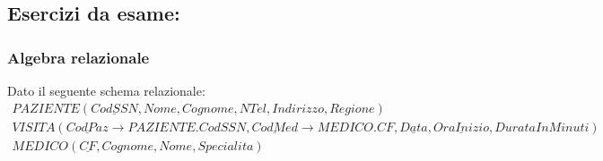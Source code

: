 \documentclass{article}
\begin{document}
\subsection{Esercizi da esame:}
\subsubsection{Algebra relazionale}
Dato il seguente schema relazionale: \begin{align*}
    PAZIENTE(\underline{CodSSN}, Nome, Cognome, NTel, Indirizzo, Regione) \\
    VISITA(\underline{CodPaz} \to PAZIENTE.CodSSN, \underline{CodMed} \to MEDICO.CF,\underline{Data},\underline{OraInizio}, DurataInMinuti) \\
    MEDICO(\underline{CF}, Cognome, Nome, Specialita)
\end{align*}
\end{document}
